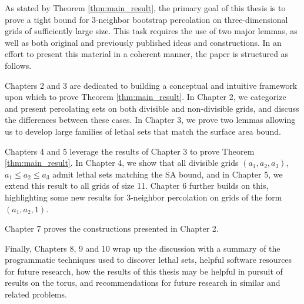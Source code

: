 As stated by Theorem \ref{thm:main_result}, the primary goal of this thesis is to prove a tight bound for 3-neighbor bootstrap percolation on three-dimensional grids of sufficiently large size. This task requires the use of two major lemmas, as well as both original and previously published ideas and constructions. In an effort to present this material in a coherent manner, the paper is structured as follows. 

Chapters 2 and 3 are dedicated to building a conceptual and intuitive framework upon which to prove Theorem \ref{thm:main_result}. In Chapter 2, we categorize and present percolating sets on both divisible and non-divisible grids, and discuss the differences between these cases. In Chapter 3, we prove two lemmas allowing us to develop large families of lethal sets that match the surface area bound. 

Chapters 4 and 5 leverage the results of Chapter 3 to prove Theorem \ref{thm:main_result}. In Chapter 4, we show that all divisible grids $(a_1,a_2,a_3)$, $a_1 \leq a_2 \leq a_3$ admit lethal sets matching the SA bound, and in Chapter 5, we extend this result to all grids of size 11. Chapter 6 further builds on this, highlighting some new results for 3-neighbor percolation on grids of the form $(a_1,a_2,1)$.

Chapter 7 proves the constructions presented in Chapter 2.

Finally, Chapters 8, 9 and 10 wrap up the discussion with a summary of the programmatic techniques used to discover lethal sets, helpful software resources for future research, how the results of this thesis may be helpful in pursuit of results on the torus, and recommendations for future research in similar and related problems. 





